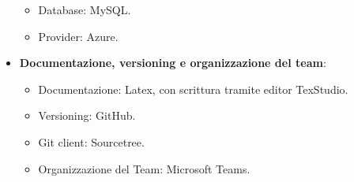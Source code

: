 \begin{itemize}
\begin{itemize}
		\item Database: MySQL.
		\item Provider: Azure.
	\end{itemize}
	\item \textbf{Documentazione, versioning e organizzazione del team}:
	\begin{itemize}
		\item Documentazione: Latex, con scrittura tramite editor TexStudio.
		\item Versioning: GitHub.
		\item Git client: Sourcetree.
		\item Organizzazione del Team: Microsoft Teams.
	\end{itemize}
\end{itemize}